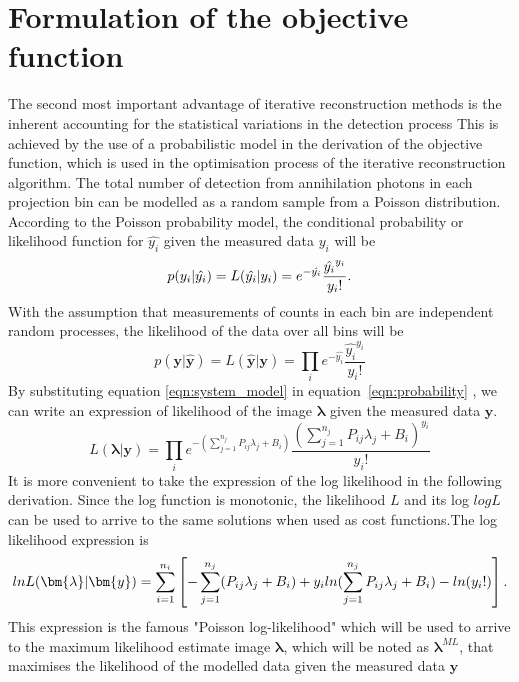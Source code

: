\section{Formulation of the objective function}
The second most important advantage of iterative reconstruction methods is the inherent accounting for the statistical variations in the detection process This is achieved by the use of a probabilistic model in the derivation of the objective function, which is used in the optimisation process of the iterative reconstruction algorithm.
The total number of detection from annihilation photons in each projection bin can be modelled as a random sample from a Poisson distribution. According to the Poisson probability model, the conditional probability or likelihood function for $\hat{y_i}$ given the measured data ${y_i}$ will be
\begin{equation}
p({y_i}|{\hat{y_i}}) = L({\hat{y_i}}|{y_i}) = e^{-\hat{y_i}} \frac{\hat{y_i}^{y_i}}{{y_i}!}  \\  .
\end{equation}
With the assumption that measurements of counts in each bin are independent random processes, the likelihood of the data over all bins will be
\begin{equation}
p(\bm{y}|\bm{\hat{y}}) = L(\bm{\hat{y}}|\bm{y}) = \prod_i e^{-\hat{y_i}} \frac{\hat{y_i}^{y_i}}{{y_i}!} 
\label{eqn:probability}
\end{equation}
By substituting equation \ref{eqn:system_model} in equation~\ref{eqn:probability} , we can write an expression of likelihood of the image $\bm{\lambda}$ given the measured data $\bm{y}$.
\begin{equation}
    L(\bm{\lambda}|\bm{y})  = \prod_i e^{-(\sum_{j=1}^{n_j} P_{ij} \lambda_j + B_{i} )} \frac{(\sum_{j=1}^{n_j} P_{ij} \lambda_j + B_{i} )^{y_i}}{{y_i}!}
\end{equation}It is more convenient to take the expression of the log likelihood in the following derivation. Since the log function is monotonic, the likelihood $L$ and its log $logL$ can be used to arrive to the same solutions when used as cost functions.The log likelihood expression is
\begin{equation}
    lnL(\bm{\lambda}|\bm{y})  = \sum_{i=1}^{n_i}\left[  -\sum_{j=1}^{n_j} (P_{ij} \lambda_j + B_i) + y_i ln(\sum_{j=1}^{n_j} P_{ij} \lambda_j + B_i) - ln({y_i}!) \right] \\.
\label{eqn:log_likelihood}
\end{equation}
This expression is the famous  "Poisson log-likelihood"  which will be used to arrive to the maximum likelihood estimate image $\bm\lambda$, which will be noted as $\bm{\lambda}^{ML}$, that maximises the likelihood of the modelled data given the measured data  $\bm{y}$


